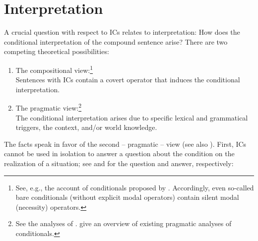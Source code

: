 \documentclass[output=paper,colorlinks,citecolor=brown,
modfonts,newtxmath
]{langscibook}
\begin{document}

\section{Interpretation}\label{sec:interpretation}

A crucial question with respect to ICs relates to interpretation: How does the conditional interpretation of the compound sentence arise? There are two competing theoretical possibilities:

\begin{enumerate}

\item The compositional view:\footnote{See, e.g., the account of conditionals proposed by \citet{Kratzer1979,Kratzer1986,Kratzer1991}. Accordingly, even so-called bare conditionals (without explicit modal operators) contain silent modal (necessity) operators.}\\ Sentences with ICs contain a covert operator that induces the conditional interpretation.

\item The pragmatic view:\footnote{See the analyses of \citet{Stalnaker1975,ByrneJohnsonLaird2010,ElderJaszczolt2016}. \citet[41]{ElderJaszczolt2016} give an overview of existing pragmatic analyses of conditionals.}\\ The conditional interpretation arises due to specific lexical and grammatical triggers, the context, and/or world knowledge.

\end{enumerate}

\noindent The facts speak in favor of the second -- pragmatic -- view (see also \citealt{Milotova2011,Milotova2012}). First, ICs cannot be used in isolation to answer a question about the condition on the realization of a situation; see  and  for the question and answer, respectively:

\ea\label{ex:frage}
\z
\z
\end{document}
